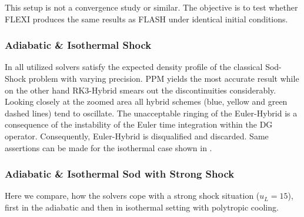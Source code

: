 This setup is not a convergence study or similar. The objective is to test
whether FLEXI produces the same results as FLASH under identical initial
conditions.


\subsubsection{Adiabatic \& Isothermal Shock}
In  all utilized solvers satisfy the
expected density profile of the classical Sod-Shock problem with varying
precision. PPM yields the most accurate result while on the other hand
RK3-Hybrid smears out the discontinuities considerably. Looking closely at the
zoomed area all hybrid schemes (blue, yellow and green dashed lines) tend to
oscillate.  The unacceptable ringing of the Euler-Hybrid is a consequence of
the instability of the Euler time integration within the DG operator.
Consequently, Euler-Hybrid is disqualified and discarded.  Same assertions
can be made for the isothermal case shown in
.

\subsubsection{Adiabatic \& Isothermal Sod with Strong Shock}
Here we compare, how the solvers cope with a strong shock situation ($u_L = 15$),
first in the adiabatic and then in isothermal setting with polytropic cooling.

